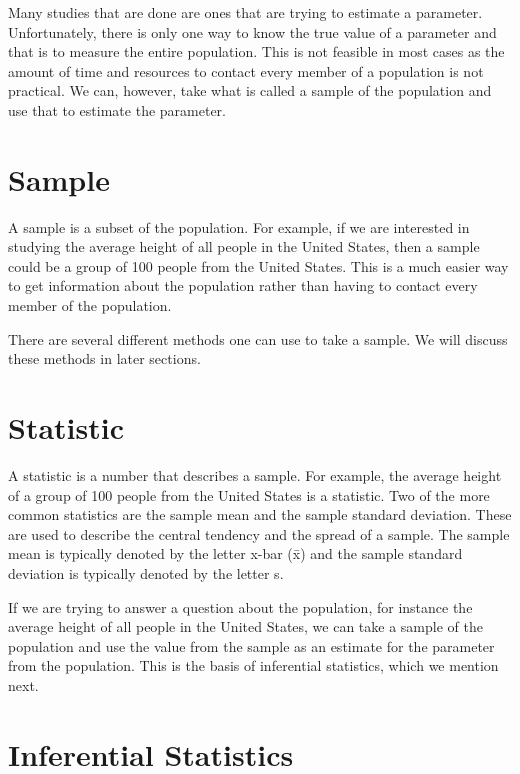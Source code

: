 \documentclass[
  letterpaper,
  DIV=11,
  numbers=noendperiod]{scrreprt}
\begin{document}
Many studies that are done are ones that are trying to estimate a
parameter. Unfortunately, there is only one way to know the true value
of a parameter and that is to measure the entire population. This is not
feasible in most cases as the amount of time and resources to contact
every member of a population is not practical. We can, however, take
what is called a sample of the population and use that to estimate the
parameter.

\section*{Sample}\label{sample}


A sample is a subset of the population. For example, if we are
interested in studying the average height of all people in the United
States, then a sample could be a group of 100 people from the United
States. This is a much easier way to get information about the
population rather than having to contact every member of the population.

There are several different methods one can use to take a sample. We
will discuss these methods in later sections.

\section*{Statistic}\label{statistic}


A statistic is a number that describes a sample. For example, the
average height of a group of 100 people from the United States is a
statistic. Two of the more common statistics are the sample mean and the
sample standard deviation. These are used to describe the central
tendency and the spread of a sample. The sample mean is typically
denoted by the letter x-bar (x̄) and the sample standard deviation is
typically denoted by the letter s.

If we are trying to answer a question about the population, for instance
the average height of all people in the United States, we can take a
sample of the population and use the value from the sample as an
estimate for the parameter from the population. This is the basis of
inferential statistics, which we mention next.

\section*{Inferential Statistics}\label{inferential-statistics}
\end{document}
